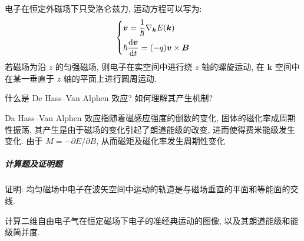 \documentclass[UTF8]{ctexart}
\newenvironment{Answer}{}{}
\begin{document}
\begin{Question}
\begin{Answer}
    \begin{Solve}[Solve:]
        \hspace*{2em}电子在恒定外磁场下只受洛仑兹力, 运动方程可以写为:
            \begin{equation*}
                \begin{dcases}
                    \bm{v} = \dfrac{1}{\hbar} \nabla_{\bm{k}} E(\bm{k}) \\
                    \hbar \dfrac{\mathrm{d} \bm{v}}{\mathrm{d} t} = (-q) \bm{v} \times \bm{B}
                \end{dcases}
            \end{equation*}
        \hspace*{2em}若磁场为沿 $z$ 的匀强磁场, 则电子在实空间中进行绕 $z$ 轴的螺旋运动, 在 $\bm{k}$ 空间中在某一垂直于 $z$ 轴的平面上进行圆周运动.
    \end{Solve}
\end{Answer}

            \item 什么是 De Hass--Van Alphen 效应? 如何理解其产生机制?

\begin{Answer}
    \begin{Solve}[Solve:]
        \hspace*{2em}Da Hass--Van Alphen 效应指随着磁感应强度的倒数的变化, 固体的磁化率成周期性振荡. 其产生是由于磁场的变化引起了朗道能级的改变, 进而使得费米能级发生变化. 由于 $M = - \partial E / \partial B$, 从而磁矩及磁化率发生周期性变化
    \end{Solve}
\end{Answer}
        \end{Question}

    \subparagraph{计算题及证明题}
        \begin{Question}
            \item 证明: 均匀磁场中电子在波矢空间中运动的轨道是与磁场垂直的平面和等能面的交线.
            \item 计算二维自由电子气在恒定磁场下电子的准经典运动的图像, 以及其朗道能级和能级简并度.
        \end{Question}
\end{document}
